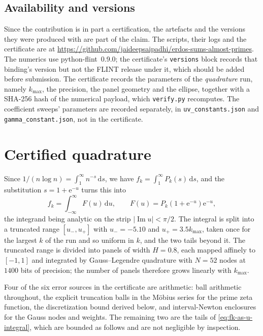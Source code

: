 \documentclass[11pt]{amsart}
\theoremstyle{plain}
\theoremstyle{definition}
\newcommand{\e}{\mathrm e}
\newcommand{\dd}{\,\mathrm d}
\newcommand{\abs}[1]{\lvert #1\rvert}
\begin{document}
\subsection*{Availability and versions}
\begingroup\sloppy
Since the contribution is in part a certification, the artefacts and the
versions they were produced with are part of the claim. The scripts, their
logs and the certificate are at
\url{https://github.com/jaideepsaipadhi/erdos-sums-almost-primes}. The
numerics use python-flint~0.9.0; the certificate's \texttt{versions} block
records that binding's version but not the FLINT release under it, which
should be added before submission. The certificate records the parameters of
the \emph{quadrature} run, namely $k_{\max}$, the precision, the panel
geometry and the ellipse, together with a SHA-256 hash of the numerical
payload, which \texttt{verify.py} recomputes. The coefficient sweeps'
parameters are recorded separately, in \texttt{uv\_constants.json} and
\texttt{gamma\_constant.json}, not in the certificate.
\endgroup

\appendix
\section{Certified quadrature}\label{app:quadrature}

Since $1/(n\log n)=\int_1^\infty n^{-s}\dd s$, we have
$f_k=\int_1^\infty P_k(s)\dd s$, and the substitution $s=1+\e^{-u}$ turns this
into
\begin{equation}\label{eq:fk-as-u-integral}
 f_k=\int_{-\infty}^{\infty}F(u)\dd u,
 \qquad F(u)=P_k(1+\e^{-u})\e^{-u},
\end{equation}
the integrand being analytic on the strip $\abs{\operatorname{Im}u}<\pi/2$.
The integral is split into a truncated range $[u_-,u_+]$ with
$u_-=-5.10$ and $u_+=3.5k_{\max}$, taken once for the largest $k$ of the run
and so uniform in $k$, and the two tails beyond it. The truncated range is
divided into panels of width $H=0.8$, each mapped affinely to $[-1,1]$ and
integrated by Gauss--Legendre quadrature with $N=52$ nodes at $1400$ bits of
precision; the number of panels therefore grows linearly with $k_{\max}$.

Four of the six error sources in the certificate are arithmetic: ball
arithmetic throughout, the explicit truncation balls in the M\"obius series
\cite{Cohen} for the prime zeta function, the discretization bound derived below, and
interval-Newton enclosures for the Gauss nodes and weights. The remaining two
are the tails of \eqref{eq:fk-as-u-integral}, which are bounded as follows and
are not negligible by inspection.
\end{document}
